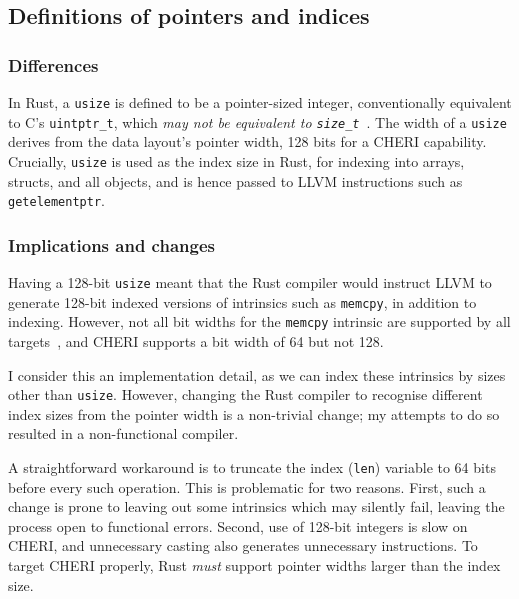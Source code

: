 \documentclass[dissertation.tex]{subfiles}
\begin{document}
\subsection{Definitions of pointers and indices}
\label{sec:rust-usize}


\subsubsection{Differences}
In Rust, a \texttt{usize} is defined to be a pointer-sized integer,
conventionally equivalent to C's \texttt{uintptr\_t}, which \emph{may
not be equivalent to \texttt{size\_t}}~\cite{rust-rfc-isize}.
The width of a \texttt{usize} derives from the data layout's pointer
width, 128 bits for a CHERI capability.
Crucially, \texttt{usize} is used as the index size in Rust, for
indexing into arrays, structs, and all objects, and is hence passed to
LLVM instructions such as \texttt{getelementptr}.

\subsubsection{Implications and changes}
Having a 128-bit \texttt{usize} meant that the Rust compiler would
instruct LLVM to generate 128-bit indexed versions of intrinsics such as
\texttt{memcpy}, in addition to indexing.
However, not all bit widths for the \texttt{memcpy} intrinsic are
supported by all targets~\cite{llvm-langref}, and CHERI supports a bit
width of 64 but not 128.

I consider this an implementation detail, as we can index these
intrinsics by sizes other than \texttt{usize}.
However, changing the Rust compiler to recognise different index sizes
from the pointer width is a non-trivial change; my attempts to do so
resulted in a non-functional compiler.

A straightforward workaround is to truncate the index (\texttt{len})
variable to 64 bits before every such operation.
This is problematic for two reasons.
First, such a change is prone to leaving out some intrinsics which may
silently fail, leaving the process open to functional errors.
Second, use of 128-bit integers is slow on CHERI, and unnecessary
casting also generates unnecessary instructions.
To target CHERI properly, Rust \emph{must} support pointer widths larger
than the index size.
\end{document}
